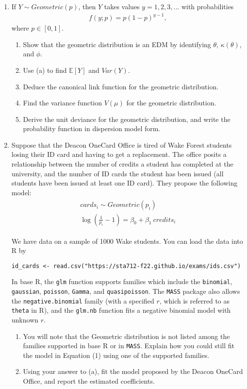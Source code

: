 \documentclass[11pt]{article}
\begin{document}
\begin{enumerate}
\item If $Y \sim Geometric(p)$, then $Y$ takes values $y = 1, 2, 3,...$ with probabilities
\begin{align*}
f(y;p) = p(1 - p)^{y-1},
\end{align*}
where $p \in [0, 1]$.
\begin{enumerate}
\item Show that the geometric distribution is an EDM by identifying $\theta$, $\kappa(\theta)$, and $\phi$.
\item Use (a) to find $\mathbb{E}[Y]$ and $Var(Y)$.
\item Deduce the canonical link function for the geometric distribution.
\item Find the variance function $V(\mu)$ for the geometric distribution.
\item Derive the unit deviance for the geometric distribution, and write the probability function in dispersion model form.
\end{enumerate}

\item Suppose that the Deacon OneCard Office is tired of Wake Forest students losing their ID card and having to get a replacement. The office posits a relationship between the number of credits a student has completed at the university, and the number of ID cards the student has been issued (all students have been issued at least one ID card). They propose the following model:
\begin{align}
\begin{split}
cards_i \sim Geometric(p_i) \\
\log \left( \frac{1}{p_i} - 1 \right) = \beta_0 + \beta_1 \ credits_i
\end{split}
\end{align}

\noindent We have data on a sample of 1000 Wake students. You can load the data into R by
\begin{verbatim}
id_cards <- read.csv("https://sta712-f22.github.io/exams/ids.csv")
\end{verbatim}

In base R, the \verb;glm; function supports families which include the \verb;binomial;, \verb;gaussian;, \verb;poisson;, \verb;Gamma;, and \verb;quasipoisson;. The \verb;MASS; package also allows the \verb;negative.binomial; family (with a specified $r$, which is referred to as \verb;theta; in R), and the \verb;glm.nb; function fits a negative binomial model with unknown $r$.

\begin{enumerate}
\item You will note that the Geometric distribution is not listed among the families supported in base R or in \verb;MASS;. Explain how you could still fit the model in Equation (1) using one of the supported families.

\item Using your answer to (a), fit the model proposed by the Deacon OneCard Office, and report the estimated coefficients.
\end{enumerate}
\end{enumerate}
\end{document}
